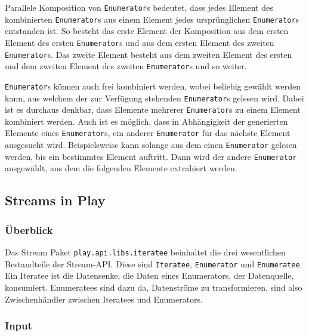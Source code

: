 \documentclass[draft=false
              ,paper=a4
              ,twoside=false
              ,fontsize=11pt
              ,headsepline
              ,BCOR10mm
              ,DIV11
              ]{scrbook}
\begin{document}
Parallele Komposition von \lstinline|Enumerator|s bedeutet, dass jedes Element des kombinierten \lstinline|Enumerator|s aus einem Element jedes ursprünglichen \lstinline|Enumerator|s entstanden ist.
So besteht das erste Element der Komposition aus dem ersten Element des ersten \lstinline|Enumerator|s und aus dem ersten Element des zweiten \lstinline|Enumerator|s.
Das zweite Element besteht aus dem zweiten Element des ersten und dem zweiten Element des zweiten \lstinline|Enumerator|s und so weiter.

\lstinline|Enumerator|s können auch frei kombiniert werden, wobei beliebig gewählt werden kann, aus welchem der zur Verfügung stehenden \lstinline|Enumerator|s gelesen wird.
Dabei ist es durchaus denkbar, dass Elemente mehrerer \lstinline|Enumerator|s zu einem Element kombiniert werden.
Auch ist es möglich, dass in Abhängigkeit der generierten Elemente eines \lstinline|Enumerator|s, ein anderer \lstinline|Enumerator| für das nächste Element ausgesucht wird.
Beispielsweise kann solange aus dem einen \lstinline|Enumerator| gelesen werden, bis ein bestimmtes Element auftritt.
Dann wird der andere \lstinline|Enumerator| ausgewählt, aus dem die folgenden Elemente extrahiert werden.






\subsection{Streams in Play} %
\label{sub:streams_in_play}


\subsubsection{Überblick} %
\label{sssec:streams_ueberblick}

Das Stream Paket \lstinline|play.api.libs.iteratee| beinhaltet die drei wesentlichen Bestandteile der Stream-API.
Diese sind \lstinline|Iteratee|, \lstinline|Enumerator| und \lstinline|Enumeratee|.
Ein Iteratee ist die Datensenke, die Daten eines Enumerators, der Datenquelle, konsumiert.
Enumeratees sind dazu da, Datenströme zu transformieren, sind also Zwischenhändler zwischen Iteratees und Enumerators.



\subsubsection{Input} %
\label{ssub:input}
\end{document}
